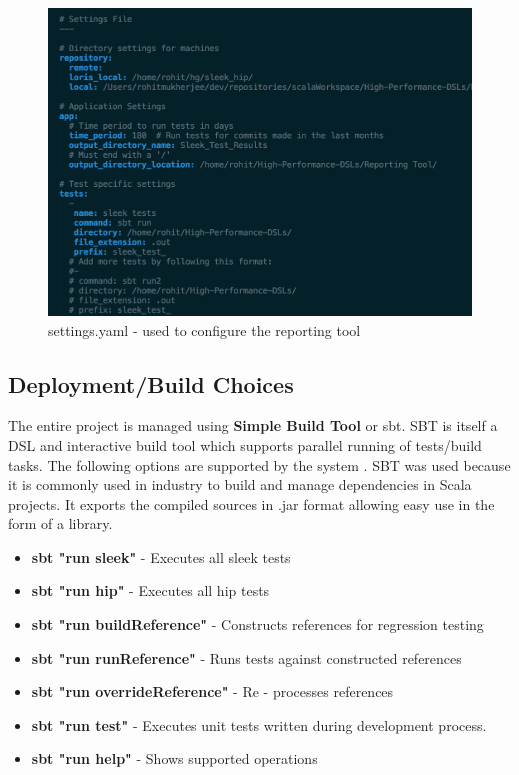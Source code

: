 \documentclass[12pt]{article}
\begin{document}
\begin{figure}[H]
  \centering
    \includegraphics[width=500px]{figures/settings.png}
  \caption{settings.yaml - used to configure the reporting tool}
\end{figure}

\subsection{Deployment/Build Choices}
The entire project is managed using \textbf{Simple Build Tool} or sbt. SBT is itself a DSL and interactive build tool which supports parallel running of tests/build tasks. The following options are supported by the system \cite{sbt}. SBT was used because it is commonly used in industry to build and manage dependencies in Scala projects. It exports the compiled sources in .jar format allowing easy use in the form of a library.
\begin{itemize}
\item \textbf{sbt "run sleek"} - Executes all sleek tests
\item \textbf{sbt "run hip"} - Executes all hip tests
\item \textbf{sbt "run buildReference"} - Constructs references for regression testing
\item \textbf{sbt "run runReference"} - Runs tests against constructed references
\item \textbf{sbt "run overrideReference"} - Re - processes references
\item \textbf{sbt "run test"} - Executes unit tests written during development process.
\item \textbf{sbt "run help"} - Shows supported operations
\end{itemize}
\newpage
\end{document}
